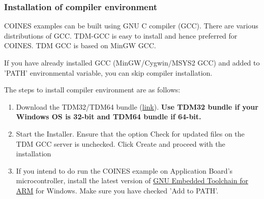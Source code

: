 \documentclass[11pt,headings=small]{scrartcl}
\begin{document}
\subsubsection{Installation of compiler environment}

COINES examples can be built using GNU C compiler (GCC). There are various distributions of GCC. TDM-GCC is easy to install and hence preferred for COINES. TDM GCC is based on MinGW GCC.

If you have already installed GCC (MinGW/Cygwin/MSYS2 GCC) and added to 'PATH' environmental variable, you can skip compiler installation.

The steps to install compiler environment are as follows:
\begin{enumerate}
	\item Download the TDM32/TDM64 bundle (\href{http://tdm-gcc.tdragon.net/}{link}). \textbf{Use TDM32 bundle if your Windows OS is 32-bit and TDM64 bundle if 64-bit.}
	\item Start the Installer. Ensure that the option Check for updated files on the TDM GCC server is unchecked. Click Create and proceed with the installation
	\item If you intend to do run the COINES example on Application Board's microcontroller, install the latest version of \href{https://developer.arm.com/downloads/-/arm-gnu-toolchain-downloads}{GNU Embedded Toolchain for ARM} for Windows. Make sure you have checked 'Add to PATH'.
\end{enumerate}
\end{document}
